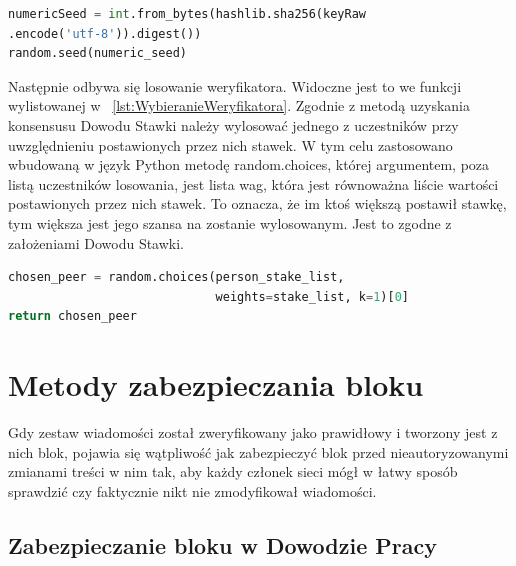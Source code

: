 \begin{lstlisting}[language=Python, extendedchars=true, caption={Ustawianie ziarna}, label={lst:UstawianieZiarna}]
numericSeed = int.from_bytes(hashlib.sha256(keyRaw
.encode('utf-8')).digest())
random.seed(numeric_seed)
\end{lstlisting}

Następnie odbywa się losowanie weryfikatora. Widoczne jest to we funkcji wylistowanej w \lstlistingname{~\ref{lst:WybieranieWeryfikatora}}. Zgodnie z metodą uzyskania konsensusu Dowodu Stawki należy wylosować jednego z uczestników przy uwzględnieniu postawionych przez nich stawek. W tym celu zastosowano wbudowaną w język Python metodę random.choices, której argumentem, poza listą uczestników losowania, jest lista wag, która jest równoważna liście wartości postawionych przez nich stawek. To oznacza, że im ktoś większą postawił stawkę, tym większa jest jego szansa na zostanie wylosowanym. Jest to zgodne z założeniami Dowodu Stawki.

\begin{lstlisting}[language=Python, extendedchars=true, caption={Wybieranie weryfikatora}, label={lst:WybieranieWeryfikatora}]
chosen_peer = random.choices(person_stake_list,
                             weights=stake_list, k=1)[0]
return chosen_peer
\end{lstlisting}

\section{Metody zabezpieczania bloku}
\label{sec:ZabezpieczenieBloku}

Gdy zestaw wiadomości został zweryfikowany jako prawidłowy i tworzony jest z nich blok, pojawia się wątpliwość jak zabezpieczyć blok przed nieautoryzowanymi zmianami treści w nim tak, aby każdy członek sieci mógł w łatwy sposób sprawdzić czy faktycznie nikt nie zmodyfikował wiadomości.

\subsection{Zabezpieczanie bloku w Dowodzie Pracy}
\label{ssec:ZabezpieczenieBlokuPoW}

